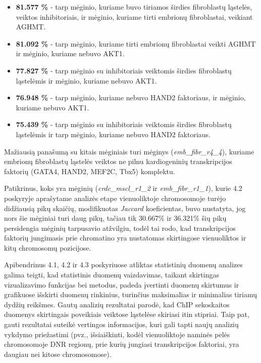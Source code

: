 \documentclass[12pt]{article}
\begin{document}
\begin{itemize}
    \item \textbf{81.577 \%} - tarp mėginio, kuriame buvo tiriamos širdies
        fibroblastų ląstelės, veiktos inhibitoriais, ir mėginio, kuriame
        tirti embrionų fibroblastai, veikiant AGHMT.
    \item \textbf{81.092 \%} - tarp mėginio, kuriame tirti embrionų
        fibroblastai veikti AGHMT ir mėginio, kuriame nebuvo AKT1.
    \item \textbf{77.827 \%} - tarp mėginio su inhibitoriais veiktomis
        širdies fibroblastų ląstelėmis ir mėginio, kuriame nebuvo AKT1.
    \item \textbf{76.948 \%} - tarp mėginio, kuriame nebuvo HAND2 faktoriaus,
        ir mėginio, kuriame nebuvo AKT1.
    \item \textbf{75.439 \%} - tarp mėginio su inhibitoriais veiktomis
        širdies fibroblastų ląstelėmis ir tarp mėginio, kuriame nebuvo HAND2
        faktoriaus.
  \end{itemize}

Mažiausią panašumą su kitais mėginiais turi mėginys
(\small\emph{emb\_fibr\_r4\_4}), kuriame embrionų fibroblastų ląstelės
veiktos ne pilnu kardiogeninių transkripcijos faktorių (GATA4, HAND2, MEF2C,
Tbx5) komplektu.

Patikrinus, koks yra mėginių
(\small\emph{crdc\_mscl\_r1\_2} ir \small\emph{emb\_fibr\_r1\_1}),
kurie 4.2 poskyryje aprašytame analizės etape vienuoliktoje chromosomoje
turėjo didžiausią pikų skaičių, modifikuotas \emph{Jaccard} koeficientas,
buvo nustatyta, jog nors šie mėginiai turi daug pikų, tačiau tik 30.667\% ir
36.321\% šių pikų persidengia mėginių tarpusavio atžvilgiu, todėl tai rodo,
kad transkripcijos faktorių jungimasis prie chromatino yra nustatomas
skirtingose vienuoliktos ir kitų chromosomų pozicijose.

Apibendrinus 4.1, 4.2 ir 4.3 poskyriuose atliktas statistinių duomenų analizes
galima teigti, kad statistinis duomenų vaizdavimas, taikant skirtingas
vizualizavimo funkcijas bei metodus, padeda įvertinti duomenų skirtumus ir
grafikuose išskirti duomenų rinkinius, turinčius maksimalias ir minimalias
tiriamų dydžių reikšmes. Gautų analizių rezultatai parodė, kad ChIP sekoskaitos
duomenys skirtingais poveikiais veiktose ląstelėse skiriasi itin stipriai.
Taip pat, gauti rezultatai suteikė vertingos informacijos, kuri gali tapti
naujų analizių vykdymo priežastimi (pvz., išsiaiškinti, kodėl vienuoliktoje
naminės pelės chromosomoje DNR regionų, prie kurių jungiasi transkripcijos
faktoriai, yra daugiau nei kitose chromosomose).
\end{document}
